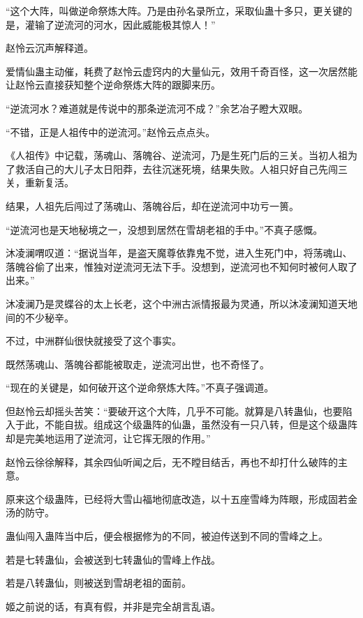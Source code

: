 
\begin{this_body}

“这个大阵，叫做逆命祭炼大阵。乃是由孙名录所立，采取仙蛊十多只，更关键的是，灌输了逆流河的河水，因此威能极其惊人！”

赵怜云沉声解释道。

爱情仙蛊主动催，耗费了赵怜云虚窍内的大量仙元，效用千奇百怪，这一次居然能让赵怜云直接获知整个逆命祭炼大阵的跟脚来历。

“逆流河水？难道就是传说中的那条逆流河不成？”余艺冶子瞪大双眼。

“不错，正是人祖传中的逆流河。”赵怜云点点头。

《人祖传》中记载，荡魂山、落魄谷、逆流河，乃是生死门后的三关。当初人祖为了救活自己的大儿子太日阳莽，去往沉迷死境，结果失败。人祖只好自己先闯三关，重新复活。

结果，人祖先后闯过了荡魂山、落魄谷后，却在逆流河中功亏一篑。

“逆流河也是天地秘境之一，没想到居然在雪胡老祖的手中。”不真子感慨。

沐凌澜喟叹道：“据说当年，是盗天魔尊依靠鬼不觉，进入生死门中，将荡魂山、落魄谷偷了出来，惟独对逆流河无法下手。没想到，逆流河也不知何时被何人取了出来。”

沐凌澜乃是灵蝶谷的太上长老，这个中洲古派情报最为灵通，所以沐凌澜知道天地间的不少秘辛。

不过，中洲群仙很快就接受了这个事实。

既然荡魂山、落魄谷都能被取走，逆流河出世，也不奇怪了。

“现在的关键是，如何破开这个逆命祭炼大阵。”不真子强调道。

但赵怜云却摇头苦笑：“要破开这个大阵，几乎不可能。就算是八转蛊仙，也要陷入于此，不能自拔。组成这个级蛊阵的仙蛊，虽然没有一只八转，但是这个级蛊阵却是完美地运用了逆流河，让它挥无限的作用。”

赵怜云徐徐解释，其余四仙听闻之后，无不瞠目结舌，再也不却打什么破阵的主意。

原来这个级蛊阵，已经将大雪山福地彻底改造，以十五座雪峰为阵眼，形成固若金汤的防守。

蛊仙闯入蛊阵当中后，便会根据修为的不同，被迫传送到不同的雪峰之上。

若是七转蛊仙，会被送到七转蛊仙的雪峰上作战。

若是八转蛊仙，则被送到雪胡老祖的面前。

姬之前说的话，有真有假，并非是完全胡言乱语。


\end{this_body}
